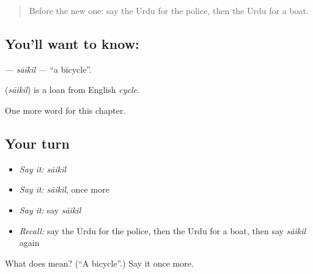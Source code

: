 \begin{quote}
Before the new one: say the Urdu for the police, then the Urdu for a boat.
\end{quote}

\subsection*{You'll want to know: }
\textbf{} — \emph{sāikil} — \textquotedblleft{}a bicycle\textquotedblright{}.

\begin{cousinweb}
\textbf{} (\emph{sāikil}) is a loan from English \emph{cycle}.
\end{cousinweb}

\begin{grammarlens}[title={What you've built}]
One more word for this chapter.
\end{grammarlens}

\subsection*{Your turn}
\begin{itemize}
\raggedright
  \item \emph{Say it:} \emph{sāikil}
  \item \emph{Say it:} \emph{sāikil}, once more
  \item \emph{Say it:} say \emph{sāikil}
  \item \emph{Recall:} say the Urdu for the police, then the Urdu for a boat, then say \emph{sāikil} again
\end{itemize}

\begin{tcolorbox}[breakable,colback=teal!4,colframe=teal!35!black,title={Before you move on}]
What does  mean? (\textquotedblleft{}A bicycle\textquotedblright{}.) Say it once more.
\end{tcolorbox}

